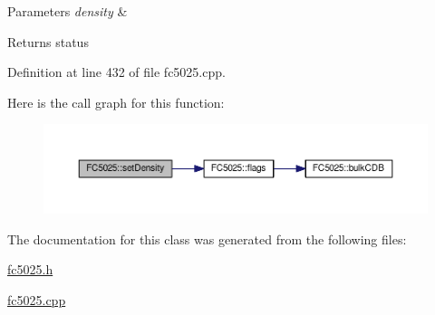 \begin{DoxyParams}{Parameters}
{\em density} & \\
\hline
\end{DoxyParams}
\begin{DoxyReturn}{Returns}
status 
\end{DoxyReturn}


Definition at line 432 of file fc5025.\+cpp.



Here is the call graph for this function\+:
\nopagebreak
\begin{figure}[H]
\begin{center}
\leavevmode
\includegraphics[width=350pt]{classFC5025_afff5293f6d1011a7b107607f544fedf5_cgraph}
\end{center}
\end{figure}




The documentation for this class was generated from the following files\+:\begin{DoxyCompactItemize}
\item 
\hyperlink{fc5025_8h}{fc5025.\+h}\item 
\hyperlink{fc5025_8cpp}{fc5025.\+cpp}\end{DoxyCompactItemize}
